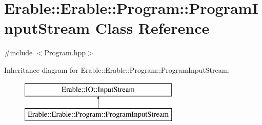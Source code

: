 \hypertarget{class_erable_1_1_erable_1_1_program_1_1_program_input_stream}{}\section{Erable\+::Erable\+::Program\+::Program\+Input\+Stream Class Reference}
\label{class_erable_1_1_erable_1_1_program_1_1_program_input_stream}


{\ttfamily \#include $<$Program.\+hpp$>$}

Inheritance diagram for Erable\+::Erable\+::Program\+::Program\+Input\+Stream\+:\begin{figure}[H]
\begin{center}
\leavevmode
\includegraphics[height=2.000000cm]{class_erable_1_1_erable_1_1_program_1_1_program_input_stream}
\end{center}
\end{figure}
